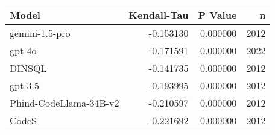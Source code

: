 \begin{tabular}{lrrr}
\toprule
Model & Kendall-Tau & P Value & n \\
\midrule
gemini-1.5-pro & -0.153130 & 0.000000 & 2012 \\
gpt-4o & -0.171591 & 0.000000 & 2022 \\
DINSQL & -0.141735 & 0.000000 & 2012 \\
gpt-3.5 & -0.193995 & 0.000000 & 2012 \\
Phind-CodeLlama-34B-v2 & -0.210597 & 0.000000 & 2012 \\
CodeS & -0.221692 & 0.000000 & 2012 \\
\bottomrule
\end{tabular}
